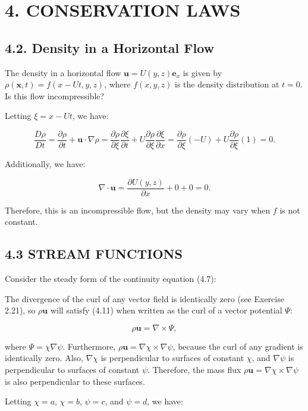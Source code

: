 \documentclass{article}
\begin{document}
\section{4. CONSERVATION LAWS}

\subsection{4.2. Density in a Horizontal Flow}

The density in a horizontal flow $\mathbf{u} = U(y,z)\mathbf{e}_x$ is given by $\rho(\mathbf{x}, t) = f(x - Ut, y, z)$, where $f\left(x, y, z\right)$ is the density distribution at $t=0$. Is this flow incompressible?

Letting $\xi = x - Ut$, we have:

$$
\frac{D\rho}{Dt} = \frac{\partial\rho}{\partial t} + \mathbf{u} \cdot\nabla\rho = \frac{\partial\rho}{\partial\xi}\frac{\partial\xi}{\partial t} + U\frac{\partial\rho}{\partial\xi}\frac{\partial\xi}{\partial x} = \frac{\partial\rho}{\partial\xi}(-U) + U\frac{\partial\rho}{\partial\xi}(1) = 0.
$$

Additionally, we have:

$$
\nabla\cdot\mathbf{u} = \frac{\partial U(y,z)}{\partial x} + 0 + 0 = 0.
$$

Therefore, this is an incompressible flow, but the density may vary when $f$ is not constant.

\subsection{4.3 STREAM FUNCTIONS}

Consider the steady form of the continuity equation (4.7):

The divergence of the curl of any vector field is identically zero (see Exercise 2.21), so $\rho\mathbf{u}$ will satisfy (4.11) when written as the curl of a vector potential $\Psi$:

$$
\rho\mathbf{u} = \nabla\times\Psi,
$$

where $\Psi = \chi\nabla\psi$. Furthermore, $\rho\mathbf{u} = \nabla\chi\times\nabla\psi$, because the curl of any gradient is identically zero. Also, $\nabla\chi$ is perpendicular to surfaces of constant $\chi$, and $\nabla\psi$ is perpendicular to surfaces of constant $\psi$. Therefore, the mass flux $\rho\mathbf{u} = \nabla\chi\times\nabla\psi$ is also perpendicular to these surfaces.

Letting $\chi=a$, $\chi=b$, $\psi=c$, and $\psi=d$, we have:
\end{document}
